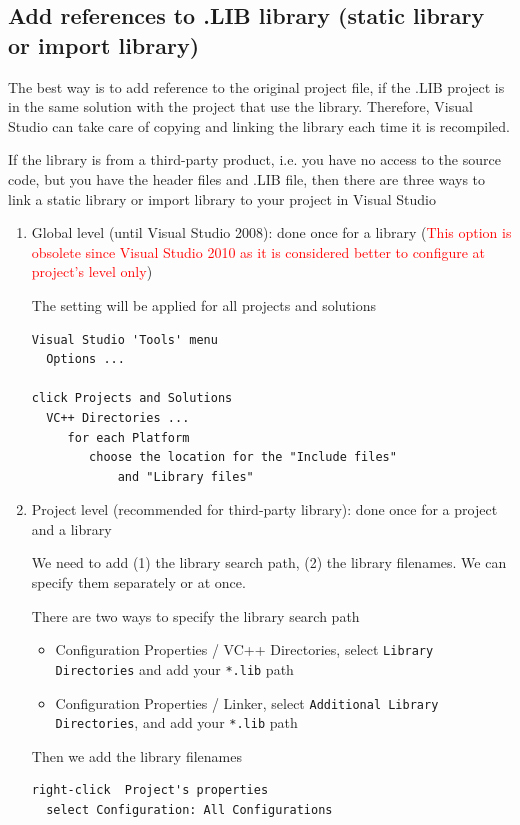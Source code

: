 \subsection{Add references to .LIB library (static library or import library)}

The best way is to add reference to the original project file, if the .LIB
project is in the same solution with the project that use the library.
Therefore, Visual Studio can take care of copying and linking the library each
time it is recompiled.

If the library is from a third-party product, i.e. you have no access to the
source code, but you have the header files and .LIB file, 
then there are three ways to link a static library or import library to your project
in Visual Studio

\begin{enumerate} 
  \item Global level (until Visual Studio 2008): done once for a library (\textcolor{red}{This option is
  obsolete since Visual Studio 2010 as it is considered better to configure at
  project's level only})

The setting will be applied for all projects and solutions
\begin{verbatim}
Visual Studio 'Tools' menu
  Options ...
     
click Projects and Solutions
  VC++ Directories ...
     for each Platform
        choose the location for the "Include files"
            and "Library files" 
\end{verbatim}
  
  \item Project level (recommended for third-party library): done once for a project and a library 

We need to add (1) the library search path, (2) the library filenames. We can specify them separately or at once. 

There are two ways to specify the library search path
\begin{itemize}
  \item Configuration Properties / VC++ Directories, select \verb!Library Directories! and add your \verb!*.lib! path
  
  \item Configuration Properties / Linker, select \verb!Additional Library Directories!, and add your \verb!*.lib! path 
\end{itemize}

Then we add the library filenames
\begin{verbatim}
right-click  Project's properties
  select Configuration: All Configurations
     

\end{verbatim}
\end{enumerate}
